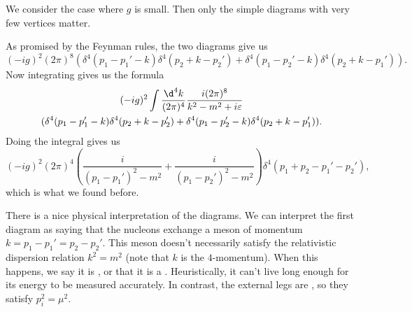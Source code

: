 \documentclass[a4paper]{article}
\begin{document}
\begin{eg}
  We consider the case where $g$ is small. Then only the simple diagrams with very few vertices matter.
  \begin{center}
    \quad
  \end{center}
  As promised by the Feynman rules, the two diagrams give us
  \[
    (-ig)^2 (2\pi)^8(\delta^4(p_1 - p_1' - k) \delta^4(p_2 + k - p_2') + \delta^4(p_1 - p_2' - k)\delta^4(p_2 + k - p_1')).
  \]
  Now integrating gives us the formula
  \begin{multline*}
    (-ig)^2 \int \frac{\d^4 k}{(2\pi)^4} \frac{i(2\pi)^8}{k^2 - m^2 + i \varepsilon}\\
    (\delta^4(p_1 - p_1' - k) \delta^4(p_2 + k - p_2')+ \delta^4(p_1 - p_2' - k)\delta^4(p_2 + k - p_1')).
  \end{multline*}
  Doing the integral gives us
  \[
    (-ig)^2 (2\pi)^4\left(\frac{i}{(p_1 - p_1')^2 - m^2} + \frac{i}{(p_1 - p_2')^2 - m^2}\right) \delta^4(p_1 + p_2 - p_1' - p_2'),
  \]
  which is what we found before.
\end{eg}
There is a nice physical interpretation of the diagrams. We can interpret the first diagram as saying that the nucleons exchange a meson of momentum $k = p_1 - p_1' = p_2 - p_2'$. This meson doesn't necessarily satisfy the relativistic dispersion relation $k^2 = m^2$ (note that $k$ is the $4$-momentum). When this happens, we say it is , or that it is a . Heuristically, it can't live long enough for its energy to be measured accurately. In contrast, the external legs are , so they satisfy $p_i^2 = \mu^2$.
\end{document}
